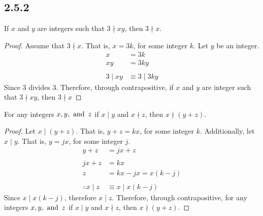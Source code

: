 \subsection*{2.5.2}
\begin{enumerate}
   If $x$ and $y$ are integers such that $3 \nmid xy$, then $3 \nmid x$.
  \begin{proof}
    Assume that $3 \nmid x$. That is, $x = 3k$, for some integer $k$.
    Let $y$ be an integer.
    \begin{align*}
      x         & = 3k              \\
      xy        & = 3ky             \\ \\
      3 \mid xy & \equiv 3 \mid 3ky
    \end{align*}
    Since $3$ divides $3$. Therefore, through contrapositive,
    if $x$ and $y$ are integer such that $3 \nmid xy$, then $3 \nmid x$
  \end{proof}
   For any integers $x,y,\operatorname{~\text{and}~} z$ if $x \mid y$ and $x \nmid z$, then $x \nmid (y+z)$.
  \begin{proof}
    Let $x \mid (y+z)$. That is, $y+z = kx$, for some integer $k$.
    Additionally, let $x \mid y$. That is, $y = jx$, for some integer $j$.
    \begin{align*}
      y + z               & = jx + z             \\ \\
      jx + z              & = kx                 \\
      z                   & = kx - jx = x(k-j)   \\ \\
      \therefore x \mid z & \equiv x \mid x(k-j)
    \end{align*}
    Since $x \mid x(k-j)$, therefore $x \mid z$. Therefore, through contrapositive,
    for any integers $x,y, \operatorname{~\text{and}~} z$ if $x \mid y$ and $x \nmid z$, then $x \nmid (y+z)$.
  \end{proof}
\end{enumerate}

